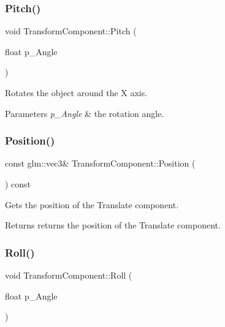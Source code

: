 \subsubsection{\texorpdfstring{Pitch()}{Pitch()}}
{\footnotesize\ttfamily void Transform\+Component\+::\+Pitch (\begin{DoxyParamCaption}\item[{float}]{p\+\_\+\+Angle }\end{DoxyParamCaption})\hspace{0.3cm}{\ttfamily [inline]}}



Rotates the object around the X axis. 


\begin{DoxyParams}{Parameters}
{\em p\+\_\+\+Angle} & the rotation angle. \\
\hline
\end{DoxyParams}
\mbox{\label{class_transform_component_afa045f69a5721b753fdcfb9abb465e32}} 
\subsubsection{\texorpdfstring{Position()}{Position()}}
{\footnotesize\ttfamily const glm\+::vec3\& Transform\+Component\+::\+Position (\begin{DoxyParamCaption}{ }\end{DoxyParamCaption}) const\hspace{0.3cm}{\ttfamily [inline]}}



Gets the position of the Translate component. 

\begin{DoxyReturn}{Returns}
returns the position of the Translate component. 
\end{DoxyReturn}
\mbox{\label{class_transform_component_ace336994b66a5dd69c33f86edbe578ad}} 
\subsubsection{\texorpdfstring{Roll()}{Roll()}}
{\footnotesize\ttfamily void Transform\+Component\+::\+Roll (\begin{DoxyParamCaption}\item[{float}]{p\+\_\+\+Angle }\end{DoxyParamCaption})\hspace{0.3cm}{\ttfamily [inline]}}



